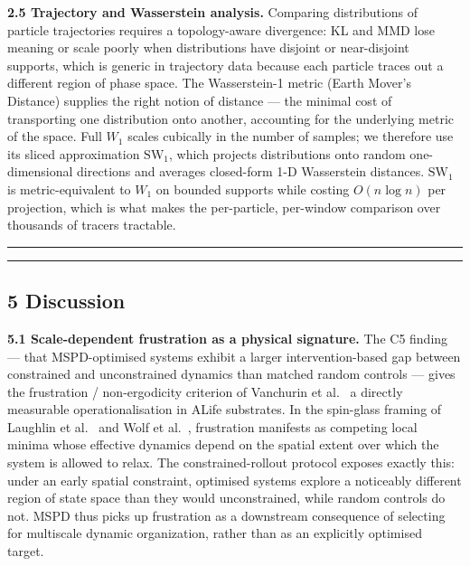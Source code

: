 \documentclass[
  11pt,
]{article}
\begin{document}
\textbf{2.5 Trajectory and Wasserstein analysis.}
Comparing distributions of particle trajectories requires a
topology-aware divergence: KL and MMD lose meaning or scale poorly
when distributions have disjoint or near-disjoint supports, which is
generic in trajectory data because each particle traces out a
different region of phase space. The Wasserstein-1 metric (Earth
Mover's Distance) supplies the right notion of distance --- the
minimal cost of transporting one distribution onto another, accounting
for the underlying metric of the space. Full $W_1$ scales cubically in
the number of samples; we therefore use its sliced approximation
$\mathrm{SW}_1$, which projects distributions onto random one-dimensional
directions and averages closed-form 1-D Wasserstein distances.
$\mathrm{SW}_1$ is metric-equivalent to $W_1$ on bounded supports
while costing $O(n \log n)$ per projection, which is what makes the
per-particle, per-window comparison over thousands of tracers
tractable.

\begin{center}\rule{0.5\linewidth}{0.5pt}\end{center}





\begin{center}\rule{0.5\linewidth}{0.5pt}\end{center}

\subsection{5 Discussion}\label{discussion}

\textbf{5.1 Scale-dependent frustration as a physical signature.}
The C5 finding --- that MSPD-optimised systems exhibit a larger
intervention-based gap between constrained and unconstrained dynamics
than matched random controls --- gives the frustration / non-ergodicity
criterion of Vanchurin et al.~\cite{vanchurin2022toward} a directly
measurable operationalisation in ALife substrates. In the spin-glass
framing of Laughlin et al.~\cite{laughlin1,laughlin2} and Wolf et al.~\cite{wolf2018physical}, frustration manifests
as competing local minima whose effective dynamics depend on the
spatial extent over which the system is allowed to relax. The
constrained-rollout protocol exposes exactly this: under an early
spatial constraint, optimised systems explore a noticeably different
region of state space than they would unconstrained, while random
controls do not. MSPD thus picks up frustration as a downstream
consequence of selecting for multiscale dynamic organization, rather
than as an explicitly optimised target.
\end{document}
